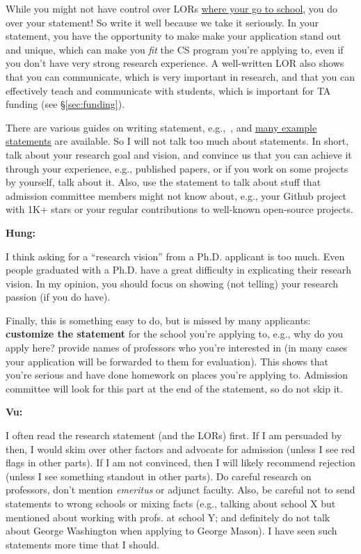 \documentclass[11pt]{article}
\newenvironment{commentbox}[1][]{
\small
    \begin{cbox}
    \textbf{#1} 
 }{
   \end{cbox}
}
\begin{document}
While you might not have control over LORs \hyperref[sec:your-school]{where your go to school}, you do over your
statement! So write it well because we take it seriously.
In your statement, you have the opportunity to make  make your application stand out and unique, which can make you \emph{fit} the CS program you're applying to, even if you don't have very strong research experience.
A well-written LOR also shows that you can communicate, which is very important in research, and that you can effectively teach and communicate with students, which is important for TA funding (see \S\ref{sec:funding}).

There are various guides on writing statement, e.g.,~\cite{blattman2022writing}, and \href{https://cs-sop.org/}{many example statements} are available. So I will not talk too much about statements. In short, talk about your research goal and vision, and convince us that you can achieve it through your experience, e.g., published papers, or if you work on some projects by yourself, talk about it. Also, use the statement to talk about stuff that admission committee members might not know about, e.g., your Github project with 1K+ stars or  your regular contributions to well-known open-source projects.

\begin{commentbox}[Hung:]
I think asking for a “research vision” from a Ph.D. applicant is too much. Even people graduated with a Ph.D. have a great difficulty in explicating their researh vision. In my opinion, you should focus on showing (not telling) your research passion (if you do have).
\end{commentbox}

Finally, this is something easy to do, but is missed by many
applicants: \textbf{customize the statement} for the school you're applying to,
e.g., why do you apply here? provide names of professors who you're interested in (in many cases your application will be forwarded to them for evaluation).
This shows that you're serious and have done homework on places you're applying to.
Admission committee will look for this part at the end of the statement, so do not skip it.



\begin{commentbox}[Vu:]
I often read the research statement (and the LORs) first. If I am
persuaded by then, I would skim over other factors and advocate for
admission (unless I see red flags in other parts). If I am not
convinced, then I will likely recommend rejection (unless I see
something standout in other parts).
\tcblower
Do careful research on professors, don't mention \emph{emeritus} or  adjunct faculty. 
Also, be careful not to send statements to wrong schools or mixing
facts (e.g., talking about school X but mentioned about working with
profs. at school Y; and definitely do not talk about George Washington when applying to George Mason). I have seen such statements more time that I
should.
\end{commentbox}
\end{document}
